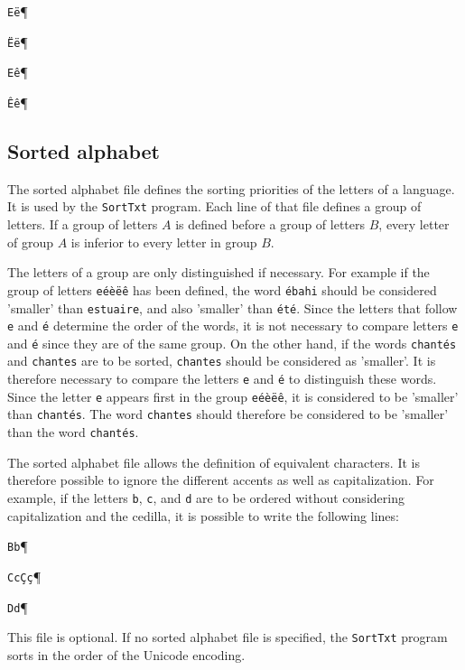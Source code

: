 \noindent
\texttt{E\"e}\P

\noindent
\texttt{\"E\"e}\P

\noindent
\texttt{E\^e}\P

\noindent
\texttt{\^E\^e}\P

\subsection{Sorted alphabet}
The sorted alphabet file defines the sorting priorities of the letters of a
language. It is used by the \verb+SortTxt+
program. Each line
of that file defines a group of letters. If a group of letters $A$ is defined
before a group of letters $B$, every letter of group $A$ is inferior to every
letter in group $B$.

\bigskip
\noindent The letters of a group are only distinguished if necessary. For example if the
group of letters \texttt{e\'e\`e\"e\^e} has been defined, the word
\texttt{\'ebahi} should be considered 'smaller' than \verb+estuaire+, and also
'smaller' than \texttt{\'et\'e}. Since the letters that follow
\verb+e+ and \texttt{\'e} determine the order of the words, it is
not necessary to compare letters \verb+e+ and \texttt{\'e} since they
are of the same group. On the other hand, if the words
\texttt{chant\'es} and \verb+chantes+ are to be sorted,
\verb+chantes+ should be considered as 'smaller'. It is therefore 
necessary to compare the letters \verb+e+ and \texttt{\'e} to
distinguish these words. Since the letter \verb+e+ appears first in the 
group \texttt{e\'e\`e\"e\^e}, it is considered to be 'smaller' than \texttt{chant\'es}. The word
\verb+chantes+ should therefore be considered to be 'smaller' than the word
\texttt{chant\'es}.

\bigskip
\noindent The sorted alphabet file allows the definition of equivalent characters.
It is therefore possible to ignore the different accents as well as
capitalization. For example, if the letters \verb+b+, \verb+c+, and \verb+d+ are
to be ordered without considering capitalization and the cedilla, it is possible
to write the following lines:

\bigskip
\noindent
\texttt{Bb}\P

\noindent
\texttt{Cc\c{C}\c{c}}\P

\noindent
\texttt{Dd}\P

\bigskip
\noindent This file is optional. If no sorted alphabet file is specified, the
\verb+SortTxt+ program sorts in the order of the Unicode encoding.



